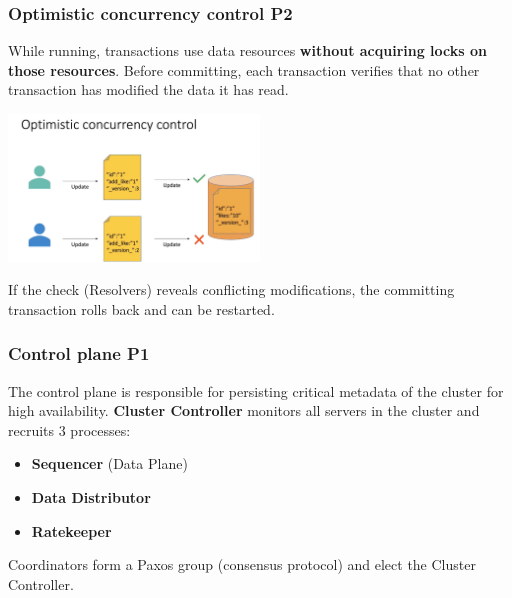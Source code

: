 \begin{frame}
	\frametitle{Optimistic concurrency control P2}
While running, transactions use data resources \textbf{without acquiring locks on those resources}. Before committing, each transaction verifies that no other transaction has modified the data it has read. 
\vspace{0.2cm}

\begin{center}
    \includegraphics[width=0.5\textwidth]{img/2-Architecture/Optimistic Concurrency Control.png}
\end{center}

If the check (Resolvers) reveals conflicting modifications, the committing transaction rolls back and can be restarted.


\end{frame}

\begin{frame}
	\frametitle{Control plane P1}

The control plane is responsible for persisting critical metadata of the cluster for high availability.
\textbf{Cluster Controller} monitors all servers in the cluster and recruits 3 processes:
\begin{itemize}
    \item \textbf{Sequencer} (Data Plane)
    \item \textbf{Data Distributor}
    \item \textbf{Ratekeeper}
\end{itemize}

Coordinators form a Paxos group (consensus protocol) and elect the Cluster Controller.
\end{frame}



